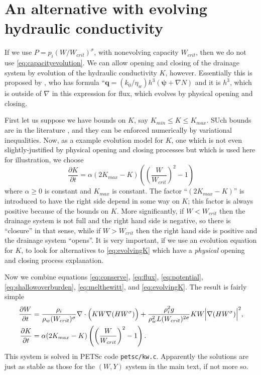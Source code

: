 \documentclass[11pt]{amsart}
\begin{document}
\section{An alternative with evolving hydraulic conductivity}  \label{app:evolveK}  If we use $P=p_i(W/W_{crit})^\sigma$, with nonevolving capacity $W_{crit}$, then we do not use \eqref{eq:capacityevolution}.  We can allow opening and closing of the drainage system by evolution of the hydraulic conductivity $K$, however.  Essentially this is proposed by \citet{Hewitt2011}, who has formula ``$\mathbf{q} = (k_0/\eta_w) h^3 (\mathbf{\psi} + \nabla N)$ and it is $h^3$, which is outside of $\nabla$ in this expression for flux, which evolves by physical opening and closing.

First let us suppose we have bounds on $K$, say $K_{min} \le K \le K_{max}$.  SUch bounds are in the literature \citep{FlowersClarke2002_theory}, and they can be enforced numerically by variational inequalities.  Now, as a example evolution model for $K$, one which is not even slightly-justified by physical opening and closing processes but which is used here for illustration, we choose
\begin{equation}\label{eq:evolvingK}
\frac{\partial K}{\partial t} = \alpha (2 K_{max} - K) \left(\left(\frac{W}{W_{crit}}\right)^2 - 1\right)
\end{equation}
where $\alpha\ge 0$ is constant and $K_{max}$ is constant.    The factor ``$(2K_{max}-K)$'' is introduced to have the right side depend in some way on $K$; this factor is always positive because of the bounds on $K$.  More significantly, if $W<W_{crit}$ then the drainage system is not full and the right hand side is negative, so there is ``closure'' in that sense, while if $W>W_{crit}$ then the right hand side is positive and the drainage system ``opens''.  It is very important, if we use an evolution equation for $K$, to look for alternatives to \eqref{eq:evolvingK} which have a \emph{physical} opening and closing process explanation.

Now we combine equations \eqref{eq:conserve}, \eqref{eq:flux}, \eqref{eq:potential}, \eqref{eq:shallowoverburden}, \eqref{eq:melthewitt}, and \eqref{eq:evolvingK}.  The result is fairly simple
\begin{align}
\frac{\partial W}{\partial t} &= \frac{\rho_i}{\rho_w( W_{crit})^\sigma} \nabla \cdot \Big(K W \nabla (H W^\sigma)\Big) + \frac{\rho_i^2 g}{\rho_w^2 L (W_{crit})^{2\sigma}} K W \Big|\nabla (H W^\sigma)\Big|^2, \label{eq:WKsystem} \\
\frac{\partial K}{\partial t} &= \alpha (2 K_{max} - K) \left(\left(\frac{W}{W_{crit}}\right)^2 - 1\right). \notag
\end{align}
This system is solved in PETSc code \texttt{petsc/kw.c}.  Apparently the solutions are just as stable as those for the $(W,Y)$ system in the main text, if not more so.
\end{document}
